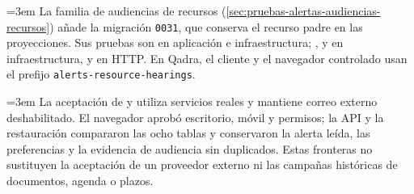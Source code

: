 {\emergencystretch=3em La familia de audiencias de recursos (\cref{sec:pruebas-alertas-audiencias-recursos}) añade la migración \texttt{0031}, que conserva el recurso padre en las proyecciones. Sus pruebas son  en aplicación e infraestructura; ,  y  en infraestructura, y  en HTTP. En Qadra, el cliente y el navegador controlado usan el prefijo \texttt{alerts-resource-hearings}.\par}

{\emergencystretch=3em La aceptación de  y  utiliza servicios reales y mantiene correo externo deshabilitado. El navegador aprobó escritorio, móvil y permisos; la API y la restauración compararon las ocho tablas y conservaron la alerta leída, las preferencias y la evidencia de audiencia sin duplicados. Estas fronteras no sustituyen la aceptación de un proveedor externo ni las campañas históricas de documentos, agenda o plazos.\par}
